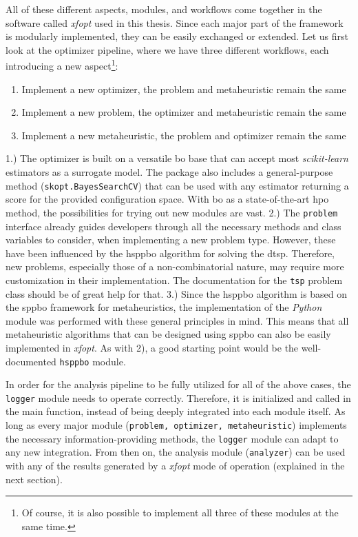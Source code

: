 All of these different aspects, modules, and workflows come together in the software called \textit{\gls{xfopt}} used in this thesis. Since each major part of the framework is
modularly implemented, they can be easily exchanged or extended. Let us first look at the optimizer pipeline, where we have three different workflows, each introducing a new aspect\footnote{Of course, it is also possible to implement all three of these modules at the same time.}:
\begin{enumerate}
	\item Implement a new optimizer, the problem and metaheuristic remain the same 
	\item Implement a new problem, the optimizer and metaheuristic remain the same 
	\item Implement a new metaheuristic, the problem and optimizer remain the same
\end{enumerate}
1.) The optimizer is built on a versatile \gls{bo} base that can accept most \textit{scikit-learn} estimators as a surrogate model. The package also includes a general-purpose method (\texttt{skopt.BayesSearchCV}) that can be used with any estimator returning a score for the provided configuration space. With \gls{bo} as a state-of-the-art \glsdesc{hpo} method, the possibilities for trying out new modules are vast.
2.) The \texttt{problem} interface already guides developers through all the necessary methods and class variables to consider, when implementing a new problem type. However, these have been influenced by the \gls{hsppbo} algorithm for solving the \gls{dtsp}. Therefore, new problems, especially those of a non-combinatorial nature, may require more customization in their implementation. The documentation for the \texttt{tsp} problem class should be of great help for that.
3.) Since the \gls{hsppbo} algorithm is based on the \gls{sppbo} framework for metaheuristics, the implementation of the \textit{Python} module was performed with these general principles in mind. This means that all metaheuristic algorithms that can be designed using \gls{sppbo} can also be easily implemented in \textit{\gls{xfopt}}. As with 2), a good starting point would be the well-documented \texttt{hsppbo} module.
 
In order for the analysis pipeline to be fully utilized for all of the above cases, the \texttt{logger} module needs to operate correctly. Therefore, it is initialized and called in the main function, instead of being deeply integrated into each module itself. As long as every major module (\texttt{problem, optimizer, metaheuristic}) implements the necessary information-providing methods, the \texttt{logger} module can adapt to any new integration. From then on, the analysis module (\texttt{analyzer}) can be used with any of the results generated by a \textit{\gls{xfopt}} mode of operation (explained in the next section).

